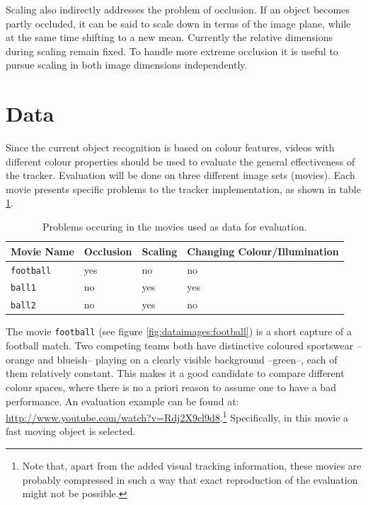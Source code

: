 \documentclass[a4paper,11pt]{article}
\begin{document}
Scaling also indirectly addresses the problem of occlusion.
If an object becomes partly occluded, it can be said to scale down in terms of the image plane, while at the same time shifting to a new mean.
Currently the relative dimensions during scaling remain fixed.
To handle more extreme occlusion it is useful to pursue scaling in both image dimensions independently.


\section{Data}
\label{sec:data}
Since the current object recognition is based on colour features, videos with different colour properties should be used to evaluate the general effectiveness of the tracker.
Evaluation will be done on three different image sets (movies).
Each movie presents specific problems to the tracker implementation, as shown in table \ref{tab:dataproblems}.

\begin{table}[ht]
  \centering
  \begin{tabular}{|l||l|l|l|}
    \hline
    Movie Name        & Occlusion & Scaling & Changing Colour/Illumination\\
    \hline
    \texttt{football} & yes       & no      & no\\
    \texttt{ball1}    & no        & yes     & yes\\
    \texttt{ball2}    & no        & yes     & no\\
    \hline
  \end{tabular}
  \caption{Problems occuring in the movies used as data for evaluation.}
  \label{tab:dataproblems}
\end{table}

The movie \texttt{football} (see figure \ref{fig:dataimages:football}) is a short capture of a football match.
Two competing teams both have distinctive coloured sportswear --orange and blueish-- playing on a clearly visible background --green--, each of them relatively constant.
This makes it a good candidate to compare different colour spaces, where there is no a priori reason to assume one to have a bad performance. An evaluation example can be found at: \url{http://www.youtube.com/watch?v=Rdj2X9cl9d8}.\footnote{Note that, apart from the added visual tracking information, these movies are probably compressed in such a way that exact reproduction of the evaluation might not be possible.}
Specifically, in this movie a fast moving object is selected.
\end{document}
